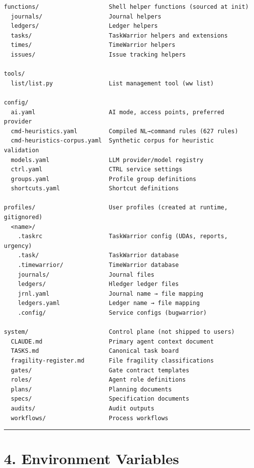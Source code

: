 \documentclass[
]{article}
\begin{document}
\begin{verbatim}
functions/                    Shell helper functions (sourced at init)
  journals/                   Journal helpers
  ledgers/                    Ledger helpers
  tasks/                      TaskWarrior helpers and extensions
  times/                      TimeWarrior helpers
  issues/                     Issue tracking helpers

tools/
  list/list.py                List management tool (ww list)

config/
  ai.yaml                     AI mode, access points, preferred provider
  cmd-heuristics.yaml         Compiled NL→command rules (627 rules)
  cmd-heuristics-corpus.yaml  Synthetic corpus for heuristic validation
  models.yaml                 LLM provider/model registry
  ctrl.yaml                   CTRL service settings
  groups.yaml                 Profile group definitions
  shortcuts.yaml              Shortcut definitions

profiles/                     User profiles (created at runtime, gitignored)
  <name>/
    .taskrc                   TaskWarrior config (UDAs, reports, urgency)
    .task/                    TaskWarrior database
    .timewarrior/             TimeWarrior database
    journals/                 Journal files
    ledgers/                  Hledger ledger files
    jrnl.yaml                 Journal name → file mapping
    ledgers.yaml              Ledger name → file mapping
    .config/                  Service configs (bugwarrior)

system/                       Control plane (not shipped to users)
  CLAUDE.md                   Primary agent context document
  TASKS.md                    Canonical task board
  fragility-register.md       File fragility classifications
  gates/                      Gate contract templates
  roles/                      Agent role definitions
  plans/                      Planning documents
  specs/                      Specification documents
  audits/                     Audit outputs
  workflows/                  Process workflows
\end{verbatim}

\begin{center}\rule{0.5\linewidth}{0.5pt}\end{center}

\section{4. Environment Variables}\label{environment-variables}
\end{document}
